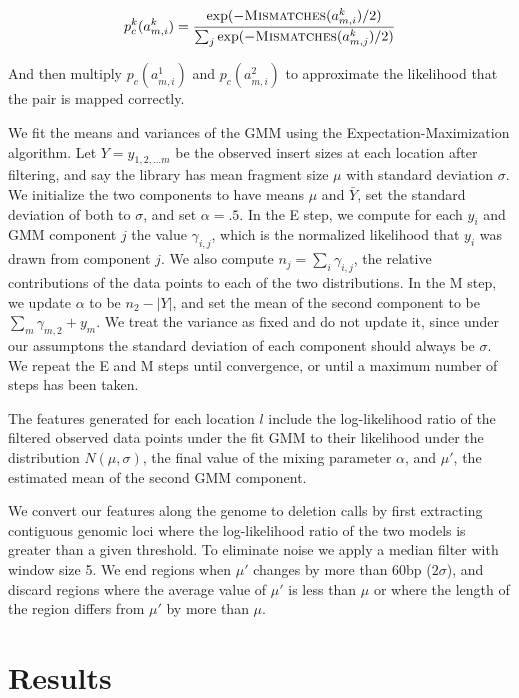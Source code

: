 \documentclass[11pt]{article}
\begin{document}
\begin{description}
\[ p^{k}_c(a^{k}_{m,i}) = \frac{\exp({-\textsc{Mismatches}(a^{k}_{m,i})/2)}}{\sum_j{\exp(-\textsc{Mismatches}(a^{k}_{m,j})/2)}} \]

And then multiply $p_c(a^{1}_{m,i})$ and $p_c(a^{2}_{m,i})$ to approximate the likelihood that the pair is mapped correctly.

We fit the means and variances of the GMM using the Expectation-Maximization algorithm. Let $Y = y_{1,2, \ldots m}$ be the observed insert sizes at each location after filtering, and say the library has mean fragment size $\mu$ with standard deviation $\sigma$. We initialize the two components to have means $\mu$ and $\bar{Y}$, set the standard deviation of both to $\sigma$, and set $\alpha = .5$. In the E step, we compute for each $y_i$ and GMM component $j$ the value $\gamma_{i,j}$, which is the normalized likelihood that $y_i$ was drawn from component $j$. We also compute $n_j = \sum_i{\gamma_{i,j}}$, the relative contributions of the data points to each of the two distributions. In the M step, we update $\alpha$ to be $n_2 - \left|Y\right|$, and set the mean of the second component to be $\sum_m{\gamma_{m,2} + y_m}$. We treat the variance as fixed and do not update it, since under our assumptons the standard deviation of each component should always be $\sigma$. We repeat the E and M steps until convergence, or until a maximum number of steps has been taken.

The features generated for each location $l$ include the log-likelihood ratio of the filtered observed data points under the fit GMM to their likelihood under the distribution $N(\mu,\sigma)$, the final value of the mixing parameter $\alpha$, and $\mu'$, the estimated mean of the second GMM component.

\item[\sc{PostProcess}] We convert our features along the genome to deletion calls by first extracting contiguous genomic loci where the log-likelihood ratio of the two models is greater than a given threshold. To eliminate noise we apply a median filter with window size 5. We end regions when $\mu'$ changes by more than 60bp ($2\sigma$), and discard regions where the average value of $\mu'$ is less than $\mu$ or where the length of the region differs from $\mu'$ by more than $\mu$.
\end{description}


\section{Results}\label{results}
\end{document}
